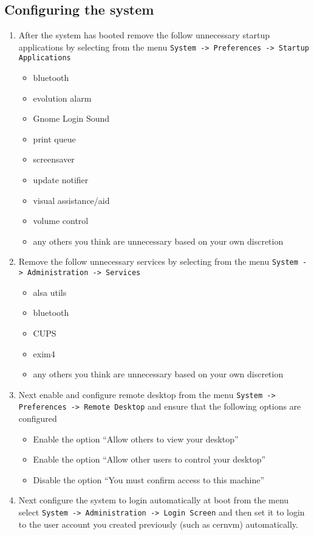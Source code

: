 \newpage
\subsection{Configuring the system}
\label{sec:debianconfig}
\begin{enumerate}
\item	After the system has booted remove the follow unnecessary startup applications by selecting from the menu  
		\verb|System -> Preferences -> Startup Applications|
\begin{itemize}
\item	bluetooth
\item	evolution alarm
\item	Gnome Login Sound
\item	print queue
\item	screensaver
\item	update notifier
\item	visual assistance/aid
\item	volume control
\item	any others you think are unnecessary based on your own discretion
\end{itemize}

\item Remove the follow unnecessary services by selecting from the menu \verb|System -> Administration -> Services|
\begin{itemize}
\item	alsa utils
\item	bluetooth
\item	CUPS
\item	exim4
\item	any others you think are unnecessary based on your own discretion
\end{itemize}

\item Next enable and configure remote desktop from the menu \verb|System -> Preferences -> Remote Desktop| and ensure
that the following options are configured
\begin{itemize}
\item	Enable the option ``Allow others to view your desktop''
\item	Enable the option ``Allow other users to control your desktop''
\item	Disable the option ``You must confirm access to this machine''
\end{itemize}

\item Next configure the system to login automatically at boot from the menu select \verb|System -> Administration -> Login Screen|
and then set it to login to the user account you created previously (such as cernvm) automatically.


\end{enumerate}
